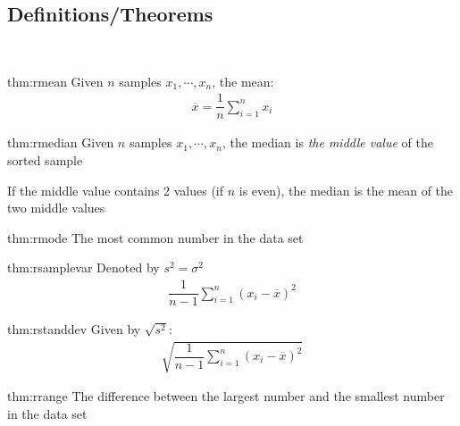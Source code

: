 \subsection{Definitions/Theorems}\hfill\\\par
\begin{theo}{thm:rmean}
  Given $n$ samples $x_1,\cdots,x_n$, the mean:
  \begin{equation*}
    \begin{gathered}
      \overline{x} = \dfrac{1}{n}\sum_{i=1}^{n}x_i
    \end{gathered}
  \end{equation*}
\end{theo}
\par\bigskip
\begin{theo}[Median]{thm:rmedian}
  Given $n$ samples $x_1,\cdots,x_n$, the median is \textit{the middle value} of the sorted sample
  \par\bigskip
  \noindent If the middle value contains 2 values (if $n$ is even), the median is the mean of the two middle values 
\end{theo}
\par\bigskip
\begin{theo}{thm:rmode}
  The most common number in the data set 
\end{theo}
\par\bigskip
\begin{theo}{thm:rsamplevar}
  Denoted by $s^2 = \sigma^2$
  \begin{equation*}
    \begin{gathered}
      \dfrac{1}{n-1}\sum_{i=1}^{n}(x_i-\overline{x})^2
    \end{gathered}
  \end{equation*}
\end{theo}
\par\bigskip
\begin{theo}{thm:rstanddev}
  Given by $\sqrt{s^2}$:
  \begin{equation*}
    \begin{gathered}
      \sqrt{\dfrac{1}{n-1}\sum_{i=1}^{n}(x_i-\overline{x})^2}
    \end{gathered}
  \end{equation*}
\end{theo}
\par\bigskip
\begin{theo}{thm:rrange}
  The difference between the largest number and the smallest number in the data set
\end{theo}
